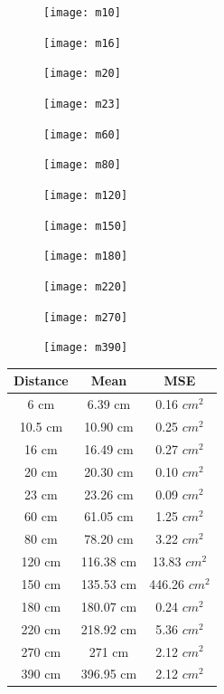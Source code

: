 \begin{figure}[H]
\texttt{[image: m10]}
\end{figure}
\begin{figure}[H]
\texttt{[image: m16]}
\end{figure}
\begin{figure}[H]
\texttt{[image: m20]}
\end{figure}
\begin{figure}[H]
\texttt{[image: m23]}
\end{figure}
\begin{figure}[H]
\texttt{[image: m60]}
\end{figure}
\begin{figure}[H]
\texttt{[image: m80]}
\end{figure}
\begin{figure}[H]
\texttt{[image: m120]}
\end{figure}
\begin{figure}[H]
\texttt{[image: m150]}
\end{figure}
\begin{figure}[H]
\texttt{[image: m180]}
\end{figure}
\begin{figure}[H]
\texttt{[image: m220]}
\end{figure}
\begin{figure}[H]
\texttt{[image: m270]}
\end{figure}
\begin{figure}[H]
\texttt{[image: m390]}
\end{figure}
\begin{center}
 \begin{tabular}{| c | c | c |} 
 \hline
 Distance & Mean & MSE\\ [0.5ex] 
 \hline\hline
 6 cm & 6.39 cm & 0.16 $cm^2$\\ 
 \hline
 10.5 cm & 10.90 cm &  0.25 $cm^2$\\
 \hline
 16 cm & 16.49 cm &  0.27 $cm^2$\\
 \hline
 20 cm& 20.30 cm& 0.10 $cm^2$\\
 \hline
 23 cm& 23.26 cm & 0.09 $cm^2$\\
 \hline
 60 cm& 61.05 cm & 1.25 $cm^2$ \\
 \hline
 80 cm& 78.20 cm & 3.22 $cm^2$ \\
 \hline
 120 cm& 116.38 cm & 13.83 $cm^2$ \\
 \hline
 150 cm& 135.53 cm& 446.26 $cm^2$\\
 \hline
 180 cm& 180.07 cm&  0.24 $cm^2$\\
 \hline
 220 cm& 218.92 cm&  5.36 $cm^2$\\
 \hline
 270 cm& 271 cm & 2.12 $cm^2$\\
 \hline
 390 cm& 396.95 cm & 2.12 $cm^2$\\ [1ex] 
 \hline
\end{tabular}
\end{center}

